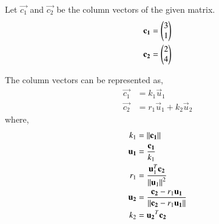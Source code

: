 

Let $\vec{c_1}$ and $\vec{c_2}$ be the column vectors of the given matrix.
\begin{align}
    \mathbf{c_1} &= \begin{pmatrix}3\\1\end{pmatrix} \label{eq:solutions/2/16/eq:1}\\
    \mathbf{c_2} &= \begin{pmatrix}2\\4\end{pmatrix} \label{eq:solutions/2/16/eq:2} 
\end{align}

The column vectors can be represented as,
\begin{align}
\vec{c_1} &=k_1\vec{u}_1 \label{eq:solutions/2/16/eq:3}\\
\vec{c_2} &=r_1\vec{u}_1+k_2\vec{u}_2 \label{eq:solutions/2/16/eq:4}
\end{align}
where, 
\begin{align}
k_1 &= \left\lVert\mathbf{c_1}\right\rVert\label{eq:solutions/2/16/eq:5}\\
\mathbf{u_1} &= \frac{\mathbf{c_1}}{k_1} \label{eq:solutions/2/16/eq:6}\\
r_1 &= \frac{\mathbf{u}_1^T\mathbf{c_2}}{\left\lVert\mathbf{u}_1\right\rVert^2} \label{eq:solutions/2/16/eq:7}\\
\mathbf{u_2} &= \frac{\mathbf{c_2} - r_1 \mathbf{u_1}}{\left\lVert\mathbf{c_2} - r_1 \mathbf{u_1}\right\rVert} \label{eq:solutions/2/16/eq:8}\\
k_2 &= {\mathbf{u_2}^T\mathbf{c_2}}\label{eq:solutions/2/16/eq:9}
\end{align}

